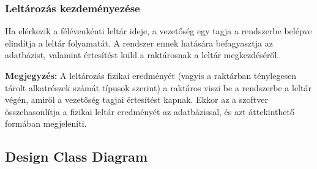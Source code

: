 \documentclass[12pt]{article}\usepackage[left=20mm,right=20mm,top=15mm,bottom=20mm]{geometry}
\begin{document}
\subsubsection{Leltározás kezdeményezése}
Ha elérkezik a félévenkénti leltár ideje, a vezetőség egy tagja a rendszerbe belépve elindítja a leltár folyamatát. 
A rendszer ennek hatására befagyasztja az adatbázist, valamint értesítést küld a raktárosnak a leltár megkezdéséről. 

\textbf{Megjegyzés:} A leltározás fizikai eredményét (vagyis a raktárban ténylegesen tárolt alkatrészek számát típusok szerint) a raktáros viszi be a rendszerbe a leltár végén, amiről a vezetőség tagjai értesítést kapnak. 
Ekkor az a szoftver összehasonlítja a fizikai leltár eredményét az adatbázissal, és azt áttekinthető formában megjeleníti. 

\subsection{Design Class Diagram}
\end{document}
